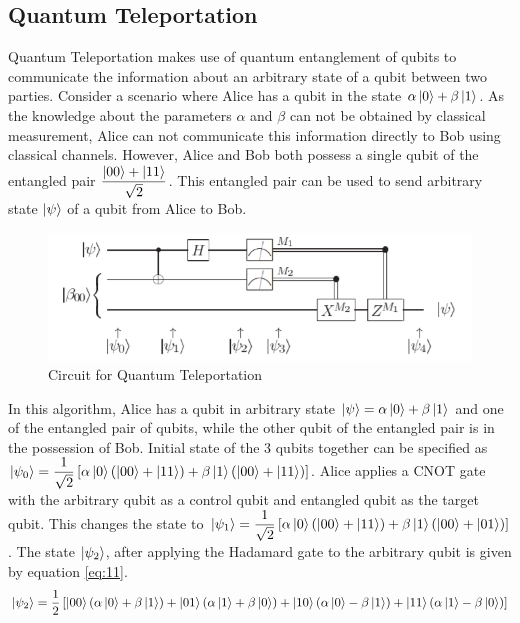 \documentclass[english,a4paper,11pt,oneside,onecolumn]{book}
\begin{document}
\subsection{Quantum Teleportation}
\label{sec:qTele}
Quantum Teleportation makes use of quantum entanglement of qubits to communicate the information about an arbitrary state of a qubit between two parties. Consider a scenario where Alice has a qubit in the state \(\alpha\ket{0} + \beta\ket{1}\). As the knowledge about the parameters \(\alpha\) and \(\beta\) can not be obtained by classical measurement, Alice can not communicate this information directly to Bob using classical channels. However, Alice and Bob both possess a single qubit of the entangled pair \(\dfrac{\ket{00} + \ket{11}}{\sqrt{2}}\). This entangled pair can be used to send arbitrary state \(\ket{\psi}\) of a qubit from Alice to Bob.
\begin{figure}[H]
    \centering
    \includegraphics[scale=0.7]{Images/quantumTeleport.png}
    \caption{Circuit for Quantum Teleportation \cite{nielsen_2019_quantum}}
    \label{fig:qTelePort}
\end{figure}
\noindent In this algorithm, Alice has a qubit in arbitrary state \(\ket{\psi}=\alpha\ket{0} + \beta\ket{1}\) and one of the entangled pair of qubits, while the other qubit of the entangled pair is in the possession of Bob. Initial state of the 3 qubits together can be specified as \(\ket{\psi_0}=\dfrac{1}{\sqrt{2}}\left[\alpha\ket{0}\left(\ket{00}+\ket{11}\right)+\beta\ket{1}\left(\ket{00}+\ket{11}\right)\right]\). Alice applies a CNOT gate with the arbitrary qubit as a control qubit and entangled qubit as the target qubit. This changes the state to \(\ket{\psi_1}=\dfrac{1}{\sqrt{2}}\left[\alpha\ket{0}\left(\ket{00}+\ket{11}\right)+\beta\ket{1}\left(\ket{00}+\ket{01}\right)\right]\). The state \(\ket{\psi_2}\), after applying the Hadamard gate to the arbitrary qubit is given by equation \ref{eq:11}.
\begin{equation}\label{eq:11}
\ket{\psi_2}=\dfrac{1}{2}\left[\ket{00}\left(\alpha\ket{0}+\beta\ket{1}\right)+\ket{01}\left(\alpha\ket{1}+\beta\ket{0}\right)+\ket{10}\left(\alpha\ket{0}-\beta\ket{1}\right)+\ket{11}\left(\alpha\ket{1}-\beta\ket{0}\right)\right]
\end{equation}
\end{document}
